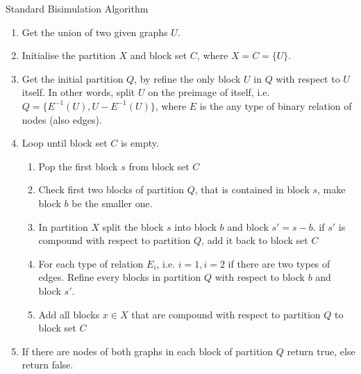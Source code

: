 \begin{algor}\label{alg:sbs}
Standard Bisimulation Algorithm
\begin{enumerate}
    \item Get the union of two given graphs $U$.
    \item Initialise the partition $X$ and block set $C$, where $X=C=\{U\}$.
    \item Get the initial partition $Q$, by refine the only block $U$ in $Q$ with respect to $U$ itself. In other words, split $U$ on the preimage of itself, i.e. $Q = \{E^{-1}(U), U-E^{-1}(U)\}$, where $E$ is the any type of binary relation of nodes (also edges).
    \item Loop until block set $C$ is empty.
    \begin{enumerate}
        \item \label{loop} Pop the first block $s$ from block set $C$
        \item Check first two blocks of partition $Q$, that is contained in block $s$, make block $b$ be the smaller one.
        \item In partition $X$ split the block $s$ into block $b$ and block $s'=s-b$. if $s'$ is compound with respect to partition $Q$, add it back to block set $C$
        \item \label{each_relation} For each type of relation $E_i$, i.e. $i=1, i=2$ if there are two types of edges.
        Refine every blocks in partition $Q$ with respect to block $b$ and block $s'$.
        \item Add all blocks $x\in X$ that are compound with respect to partition $Q$ to block set $C$
    \end{enumerate}
    \item If there are nodes of both graphs in each block of partition $Q$ return true, else return false.
\end{enumerate}

\end{algor}


